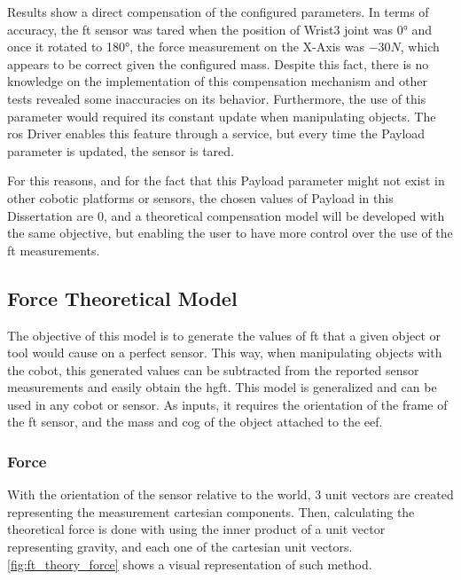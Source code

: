 \par Results show a direct compensation of the configured parameters. In terms of accuracy, the \ac{ft} sensor was tared when the position of Wrist3 joint was \ang{0} and once it rotated to \ang{180}, the force measurement on the X-Axis was $-30\si{N}$, which appears to be correct given the configured mass. Despite this fact, there is no knowledge on the implementation of this compensation mechanism and other tests revealed some inaccuracies on its behavior. Furthermore, the use of this parameter would required its constant update when manipulating objects. The \ac{ros} Driver enables this feature through a service, but every time the Payload parameter is updated, the sensor is tared. 
\par For this reasons, and for the fact that this Payload parameter might not exist in other cobotic platforms or sensors, the chosen values of Payload in this Dissertation are 0, and a theoretical compensation model will be developed with the same objective, but enabling the user to have more control over the use of the \ac{ft} measurements.

\subsection{Force Theoretical Model}
\label{ssec:ft_model}

\par The objective of this model is to generate the values of \ac{ft} that a given object or tool would cause on a perfect sensor. This way, when manipulating objects with the cobot, this generated values can be subtracted from the reported sensor measurements and easily obtain the \ac{hgft}. This model is generalized and can be used in any cobot or sensor. As inputs, it requires the orientation of the frame of the \ac{ft} sensor, and the mass and \ac{cog} of the object attached to the \ac{eef}.

\subsubsection{Force}

\par With the orientation of the sensor relative to the world, 3 unit vectors are created representing the measurement cartesian components. Then, calculating the theoretical force is done with using the inner product of a unit vector representing gravity, and each one of the cartesian unit vectors. \autoref{fig:ft_theory_force} shows a visual representation of such method.

